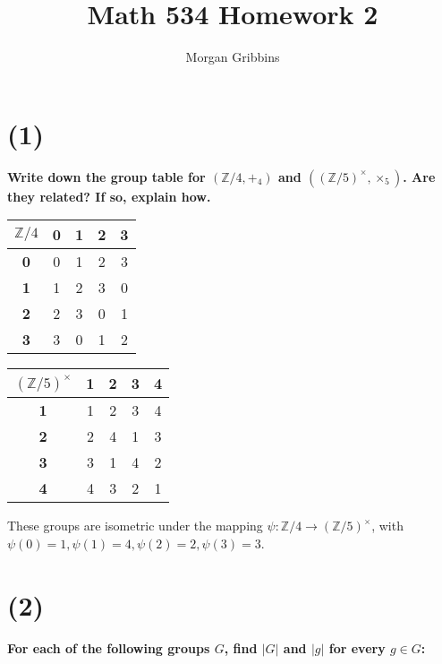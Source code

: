 \documentclass[12pt,letterpaper]{article}
\title{Math 534 Homework 2}
\author{Morgan Gribbins}
\begin{document}
	
\maketitle

\section*{(1)}
{\large \textbf{Write down the group table for \((\mathbb{Z}/4,+_{4})\) and \(((\mathbb{Z}/5)^{\times}, \times_{5})\). Are they related? If so, explain how.}
}

\begin{center}
	\begin{tabular}{|c|c|c|c|c|}
		\hline
		\(\mathbb{Z}/4\) & \textbf{0} & \textbf{1} & \textbf{2} & \textbf{3} \\
		\hline
		\textbf{0} & 0 & 1 & 2 & 3 \\
		\hline
		\textbf{1} & 1 & 2 & 3 & 0 \\
		\hline
		\textbf{2} & 2 & 3 & 0 & 1 \\
		\hline
		\textbf{3} & 3 & 0 & 1 & 2 \\
		\hline		
	\end{tabular}
\end{center}
\begin{center}
	\begin{tabular}{|c|c|c|c|c|}
		\hline
		\((\mathbb{Z}/5)^{\times}\) & \textbf{1} & \textbf{2} & \textbf{3} & \textbf{4} \\
		\hline
		\textbf{1} & 1 & 2 & 3 & 4 \\
		\hline
		\textbf{2} & 2 & 4 & 1 & 3 \\
		\hline
		\textbf{3} & 3 & 1 & 4 & 2 \\
		\hline
		\textbf{4} & 4 & 3 & 2 & 1 \\
		\hline
	\end{tabular}
\end{center}
These groups are isometric under the mapping \(\psi : \mathbb{Z}/4 \rightarrow (\mathbb{Z}/5)^{\times}\), with \(\psi(0) = 1, \psi(1) = 4, \psi(2) = 2, \psi(3) = 3\).
\section*{(2)}
{\large \textbf{For each of the following groups \(G\), find \(|G|\) and \(|g|\) for every \(g \in G\):}}
\end{document}
